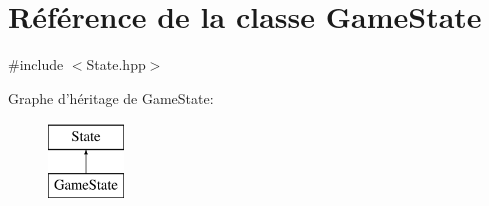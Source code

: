\hypertarget{class_game_state}{\section{Référence de la classe Game\-State}
\label{class_game_state}
}


{\ttfamily \#include $<$State.\-hpp$>$}

Graphe d'héritage de Game\-State\-:\begin{figure}[H]
\begin{center}
\leavevmode
\includegraphics[height=2.000000cm]{class_game_state}
\end{center}
\end{figure}
